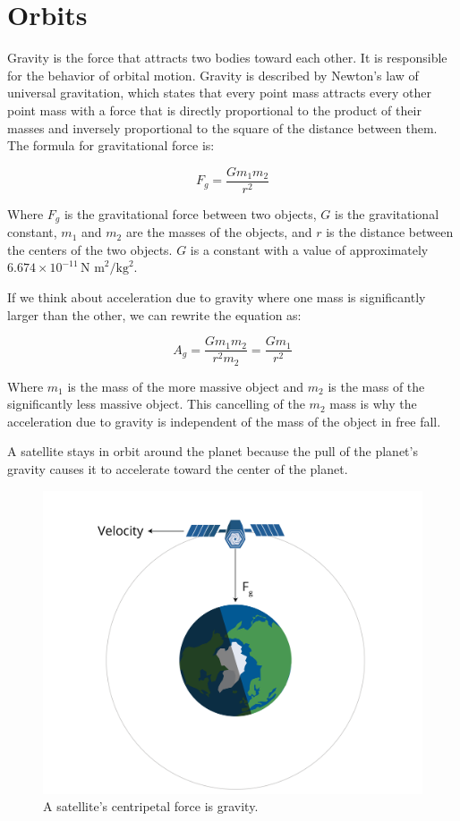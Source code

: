 \chapter{Orbits}

Gravity is the force that attracts two bodies toward each other. It is responsible for the behavior of orbital motion.
Gravity is described by Newton's law of universal gravitation, which states that every point mass attracts every other 
point mass with a force that is directly proportional to the product of their masses and inversely proportional to the 
square of the distance between them. The formula for gravitational force is:

\[
F_g = \frac{G m_1 m_2}{r^2}
\]

Where \(F_g\) is the gravitational force between two objects, \(G\) is the 
gravitational constant, \(m_1\) and \(m_2\) are the masses of the objects, 
and \(r\) is the distance between the centers of the two objects. \(G\) is 
a constant with a value of approximately \(6.674 \times 10^{-11} \, \text{N m}^2/\text{kg}^2\).

If we think about acceleration due to gravity where one mass is significantly larger than the other, we can rewrite the equation as:

\[
A_g = \frac{G m_1 m_2}{r^2 m_2} = \frac{G m_1}{r^2}
\]

Where \(m_1\) is the mass of the more massive object and \(m_2\) is the mass of the significantly less massive object. 
This cancelling of the \(m_2\) mass is why the acceleration due to gravity is independent of the mass of the object in free fall.

A satellite stays in orbit around the planet because the pull of the
planet's gravity causes it to accelerate toward the center of the
planet. 

\begin{figure}[htbp]
    \centering
    \includegraphics[width=.75\textwidth]{satellite.png}
    \caption{A satellite's centripetal force is gravity.}
    \label{fig:satellite}
\end{figure}


